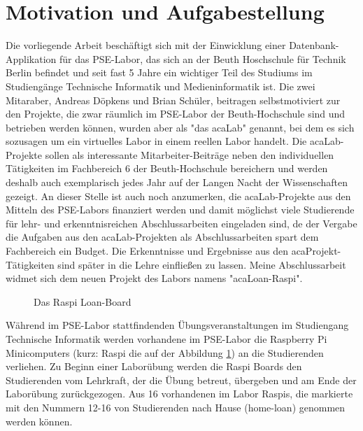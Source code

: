 \section{Motivation und Aufgabestellung}
\label{sec:intro:motivation}
Die vorliegende Arbeit beschäftigt sich mit der Einwicklung einer Datenbank-Applikation für das PSE-Labor\cite{website:17}, das sich an der Beuth Hoschschule für Technik Berlin befindet und seit fast 5 Jahre ein wichtiger Teil des Studiums im Studiengänge Technische Informatik und Medieninformatik ist. Die zwei Mitaraber, Andreas Döpkens und Brian Schüler, beitragen selbstmotiviert zur den  Projekte, die zwar räumlich im PSE-Labor der Beuth-Hochschule sind und betrieben werden können\cite{website:1}, wurden aber als "das acaLab" genannt, bei dem es sich sozusagen um ein virtuelles Labor in einem reellen Labor handelt. Die acaLab-Projekte sollen als interessante Mitarbeiter-Beiträge neben den individuellen Tätigkeiten im Fachbereich 6 der Beuth-Hochschule bereichern und werden deshalb auch exemplarisch jedes Jahr auf der Langen Nacht der Wissenschaften gezeigt\cite{website:1}. An dieser Stelle ist auch noch anzumerken, die acaLab-Projekte aus den Mitteln des PSE-Labors finanziert werden und damit möglichst viele Studierende für lehr- und erkenntnisreichen Abschlussarbeiten eingeladen sind, de der Vergabe die Aufgaben aus den acaLab-Projekten als Abschlussarbeiten spart dem Fachbereich ein Budget. Die Erkenntnisse und Ergebnisse aus den acaProjekt-Tätigkeiten sind später in die Lehre einfließen zu lassen.\cite{website:1} Meine Abschlussarbeit widmet sich dem neuen Projekt des Labors namens "acaLoan-Raspi".

\begin{figure}
	\caption{Das Raspi Loan-Board }
	\label{fig:raspiLab}
\end{figure}
Während im PSE-Labor stattfindenden Übungsveranstaltungen im Studiengang Technische Informatik werden vorhandene im PSE-Labor die Raspberry Pi Minicomputers (kurz: Raspi die auf der Abbildung \ref{fig:raspiLab})  an die Studierenden verliehen. Zu Beginn einer Laborübung werden die Raspi Boards den Studierenden vom Lehrkraft, der die Übung betreut, übergeben und am Ende der Laborübung zurückgezogen. Aus 16 vorhandenen im Labor Raspis, die markierte mit den Nummern 12-16 von Studierenden nach Hause (home-loan) genommen werden können.\cite{website:1} 

